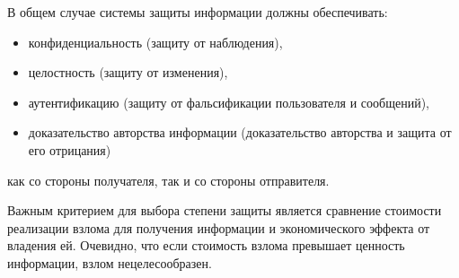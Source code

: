 В общем случае системы защиты информации должны обеспечивать:
\begin{itemize}
    \item конфиденциальность (защиту от наблюдения),
    \item целостность (защиту от изменения),
    \item аутентификацию (защиту от фальсификации пользователя и сообщений),
    \item доказательство авторства информации (доказательство авторства и защита от его отрицания)
\end{itemize}
как со стороны получателя, так и со стороны отправителя.

Важным критерием для выбора степени защиты является сравнение стоимости реализации взлома для получения информации и экономического эффекта от владения ей. Очевидно, что если стоимость взлома превышает ценность информации, взлом нецелесообразен.

